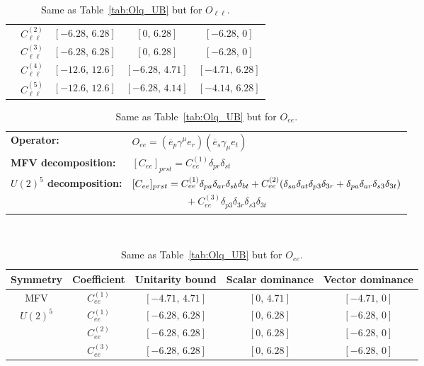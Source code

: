 \begin{table}[htbp]
{\begin{tabular}{ccccc}
        & $C_{\ell\ell}^{(2)}$ & $[-6.28,\, 6.28]$ & $[0,\, 6.28]$     & $[-6.28,\, 0]$    \\
        & $C_{\ell\ell}^{(3)}$ & $[-6.28,\, 6.28]$ & $[0,\, 6.28]$     & $[-6.28,\, 0]$    \\
        & $C_{\ell\ell}^{(4)}$ & $[-12.6,\, 12.6]$ & $[-6.28,\, 4.71]$ & $[-4.71,\, 6.28]$ \\
        & $C_{\ell\ell}^{(5)}$ & $[-12.6,\, 12.6]$ & $[-6.28,\, 4.14]$ & $[-4.14,\, 6.28]$ \\
    \bottomrule
\end{tabular}}
\caption{Same as Table~\ref{tab:Olq_UB} but for $O_{\ell\ell}$.}
\label{tab:Oll_UB}
\end{table}

\begin{table}[htbp]
\centering
{\small
\begin{tabular}{ll}
    \textbf{Operator:} &
        $\boxed{O_{ee} = (\overline e_p \gamma^\mu e_r)(\overline e_s \gamma_\mu e_t)}$ \\[0.2cm]
    \textbf{MFV decomposition:} &
        $[C_{ee}]_{prst} = C_{ee}^{(1)}\delta_{pr}\delta_{st}$ \\[0.15cm]
    \textbf{$U(2)^5$ decomposition:} &
        $[C_{ee}]_{prst} =
            C_{ee}^{(1)}\Pij{p}{r}{a}\Pij{s}{t}{b}
            + C_{ee}^{(2)}(\Pij{s}{t}{a}\delta_{p3}\delta_{3r} + \Pij{p}{r}{a}\delta_{s3}\delta_{3t})$ \\
        & $\phantom{[C_{ee}]_{prst} ={}}+ C_{ee}^{(3)}\delta_{p3}\delta_{3r}\delta_{s3}\delta_{3t}$ \\
\end{tabular}
\\[0.3cm]
\renewcommand{\arraystretch}{1.3}
\begin{tabular}{ccccc}
    \toprule
    \rowcolor{hdrcolor}
    \textbf{Symmetry} & \textbf{Coefficient}
        & \textbf{Unitarity bound}
        & \textbf{Scalar dominance}
        & \textbf{Vector dominance} \\
    \midrule
    \multirow{1}{*}{MFV}
        & $C_{ee}^{(1)}$ & $[-4.71,\, 4.71]$ & $[0,\, 4.71]$ & $[-4.71,\, 0]$ \\
    \midrule
    \multirow{3}{*}{$U(2)^5$}
        & $C_{ee}^{(1)}$ & $[-6.28,\, 6.28]$ & $[0,\, 6.28]$ & $[-6.28,\, 0]$ \\
        & $C_{ee}^{(2)}$ & $[-6.28,\, 6.28]$ & $[0,\, 6.28]$ & $[-6.28,\, 0]$ \\
        & $C_{ee}^{(3)}$ & $[-6.28,\, 6.28]$ & $[0,\, 6.28]$ & $[-6.28,\, 0]$ \\
    \bottomrule
\end{tabular}}
\caption{Same as Table~\ref{tab:Olq_UB} but for $O_{ee}$.}
\label{tab:Oee_UB}
\end{table}

